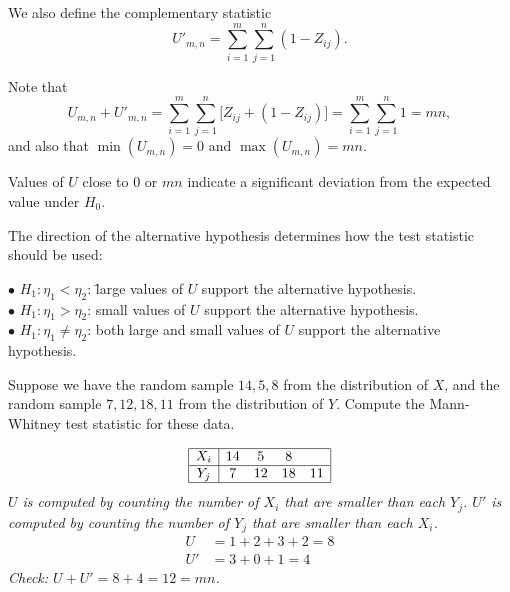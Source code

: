 We also define the complementary statistic 
\[
U'_{m,n} = \displaystyle\sum_{i=1}^m \sum_{j=1}^n (1-Z_{ij}).
\]

Note that
\[
U_{m,n} + U'_{m,n} = \sum_{i=1}^m\sum_{j=1}^n \big[Z_{ij} + (1-Z_{ij})\big] = \sum_{i=1}^m\sum_{j=1}^n 1 = mn,
\]
and also that $\min(U_{m,n})=0$ and $\max(U_{m,n})=mn$.

\begin{remark}
Values of $U$ close to $0$ or $mn$ indicate a significant deviation from the expected value under $H_0$.

\vspace*{2ex}
The direction of the alternative hypothesis determines how the test statistic should be used:
\begin{tabbing}
$\bullet$ $H_1:\eta_1 < \eta_2$:			\= large values of $U$ support the alternative hypothesis. \\
$\bullet$ $H_1:\eta_1 > \eta_2$:			\> small values of $U$ support the alternative hypothesis. \\
$\bullet$ $H_1:\eta_1 \neq \eta_2$:\qquad\qquad 	\> both large and small values of $U$ support the alternative hypothesis.
\end{tabbing}
\end{remark}


\begin{example}
Suppose we have the random sample $14,5,8$ from the distribution of $X$, and the random sample $7,12,18,11$ from the distribution of $Y$. Compute the Mann-Whitney test statistic for these data.
\end{example}

\begin{solution}
\[\begin{array}{|c|cccc|}\hline
X_i		& 14		&  5		&  8		& \\ \hline
Y_j		&  7		& 12		& 18		& 11 \\ \hline 
\end{array}\]
\bit 
\it $U$ is computed by counting the number of $X_i$ that are smaller than each $Y_j$.
\it $U'$ is computed by counting the number of $Y_j$ that are smaller than each $X_i$.
\eit
\begin{align*}
U 	& = 1 + 2 + 3 + 2 = 8 \\
U'	& = 3 + 0 + 1 = 4
\end{align*}
Check: $U+U' = 8 + 4 = 12 = mn$.
\end{solution}


